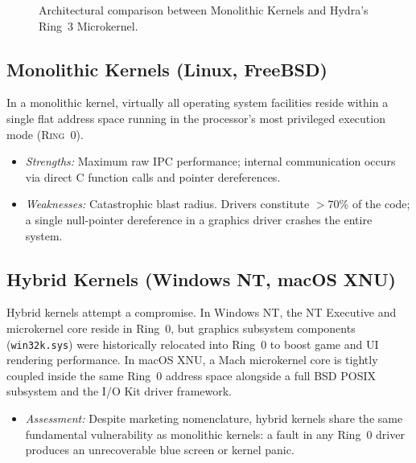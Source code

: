 \begin{figure}[htbp]
\caption{Architectural comparison between Monolithic Kernels and Hydra's Ring~3 Microkernel.}
\label{fig:mono_vs_micro}
\end{figure}

\subsection{Monolithic Kernels (Linux, FreeBSD)}
In a monolithic kernel, virtually all operating system facilities reside within a single flat address space running in the processor's most privileged execution mode (\textsc{Ring~0}).
\begin{itemize}
    \item \textit{Strengths:} Maximum raw IPC performance; internal communication occurs via direct C function calls and pointer dereferences.
    \item \textit{Weaknesses:} Catastrophic blast radius. Drivers constitute $>70\%$ of the code; a single null-pointer dereference in a graphics driver crashes the entire system.
\end{itemize}

\subsection{Hybrid Kernels (Windows NT, macOS XNU)}
Hybrid kernels attempt a compromise. In Windows NT, the NT Executive and microkernel core reside in Ring~0, but graphics subsystem components (\texttt{win32k.sys}) were historically relocated into Ring~0 to boost game and UI rendering performance. In macOS XNU, a Mach microkernel core is tightly coupled inside the same Ring~0 address space alongside a full BSD POSIX subsystem and the I/O Kit driver framework.
\begin{itemize}
    \item \textit{Assessment:} Despite marketing nomenclature, hybrid kernels share the same fundamental vulnerability as monolithic kernels: a fault in any Ring~0 driver produces an unrecoverable blue screen or kernel panic.
\end{itemize}

